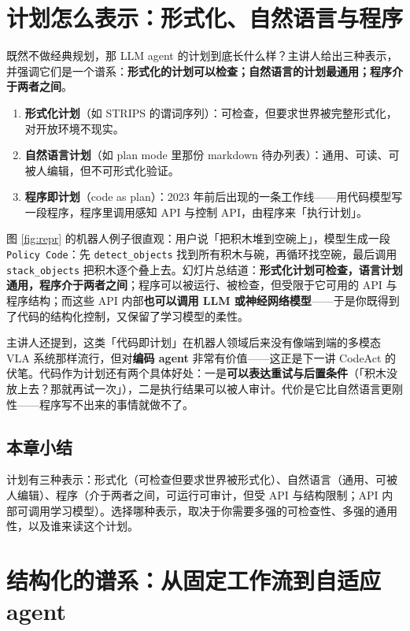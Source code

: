 \documentclass[a4paper]{article}
\begin{document}
\section{计划怎么表示：形式化、自然语言与程序}

既然不做经典规划，那 LLM agent 的计划到底长什么样？主讲人给出三种表示，并强调它们是一个谱系：\textbf{形式化的计划可以检查；自然语言的计划最通用；程序介于两者之间}。

\begin{enumerate}
\item \textbf{形式化计划}（如 STRIPS 的谓词序列）：可检查，但要求世界被完整形式化，对开放环境不现实。
\item \textbf{自然语言计划}（如 plan mode 里那份 markdown 待办列表）：通用、可读、可被人编辑，但不可形式化验证。
\item \textbf{程序即计划}（code as plan）：2023 年前后出现的一条工作线——用代码模型写一段程序，程序里调用感知 API 与控制 API，由程序来「执行计划」。
\end{enumerate}

图 \ref{fig:repr} 的机器人例子很直观：用户说「把积木堆到空碗上」，模型生成一段 \texttt{Policy Code}：先 \texttt{detect\_objects} 找到所有积木与碗，再循环找空碗，最后调用 \texttt{stack\_objects} 把积木逐个叠上去。幻灯片总结道：\textbf{形式化计划可检查，语言计划通用，程序介于两者之间}；程序可以被运行、被检查，但受限于它可用的 API 与程序结构；而这些 API 内部\textbf{也可以调用 LLM 或神经网络模型}——于是你既得到了代码的结构化控制，又保留了学习模型的柔性。

主讲人还提到，这类「代码即计划」在机器人领域后来没有像端到端的多模态 VLA 系统那样流行，但对\textbf{编码 agent} 非常有价值——这正是下一讲 CodeAct 的伏笔。代码作为计划还有两个具体好处：一是\textbf{可以表达重试与后置条件}（「积木没放上去？那就再试一次」），二是执行结果可以被人审计。代价是它比自然语言更刚性——程序写不出来的事情就做不了。

\subsection{本章小结}
计划有三种表示：形式化（可检查但要求世界被形式化）、自然语言（通用、可被人编辑）、程序（介于两者之间，可运行可审计，但受 API 与结构限制；API 内部可调用学习模型）。选择哪种表示，取决于你需要多强的可检查性、多强的通用性，以及谁来读这个计划。

\section{结构化的谱系：从固定工作流到自适应 agent}
\end{document}
